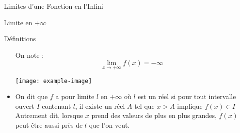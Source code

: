 \documentclass{cours}
\begin{document}
\begin{Gpartie}{Limites d'une Fonction en l'Infini}
\begin{Spartie}{Limite en $+\infty$}
\begin{SSpartie}{Définitions}
\begin{itemize}
                    On note : \[\lim\limits_{x\to +\infty}f(x)=-\infty\]
                    \begin{center}
                            \texttt{[image: example-image]}
                        \parbox{\linewidth}{}
                    \end{center}
                    \vspace*{2ex}
                    \item   On dit que $f$ a pour limite $l$ en $+\infty$ où $l$ est un réel si pour tout intervalle ouvert $I$ contenant $l$, il existe un réel $A$ tel que $x>A$ implique $f(x)\in I$ \\ Autrement dit, lorsque $x$ prend des valeurs de plus en plus grandes, $f(x)$ peut être aussi près de $l$ que l'on veut.
                    

\end{itemize}
\end{SSpartie}
\end{Spartie}
\end{Gpartie}
\end{document}
